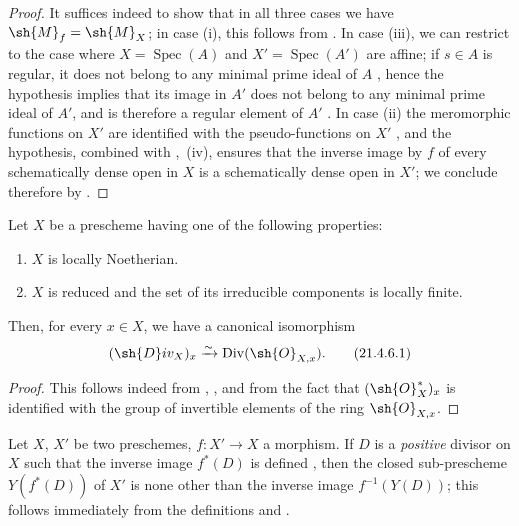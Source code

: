 \begin{proof}
It suffices indeed to show that in all three cases we have $\sh{M}_f=\sh{M}_X$;
in case (i), this follows from .
In case (iii), we can restrict to the case where $X=\operatorname{Spec}(A)$ and $X'=\operatorname{Spec}(A')$ are affine;
if $s\in A$ is regular, it does not belong to any minimal prime ideal of $A$ , hence the hypothesis implies that its image in $A'$ does not belong to any minimal prime ideal of $A'$, and is therefore a regular element of $A'$ .
In case (ii) the meromorphic functions on $X'$ are identified with the pseudo-functions on $X'$ , and the hypothesis, combined with ,~(iv), ensures that the inverse image
by $f$ of every schematically dense open in $X$ is a schematically dense open in $X'$;
we conclude therefore by .
\end{proof}

\begin{corollary}[21.4.6]
\label{IV.21.4.6}
Let $X$ be a prescheme having one of the following properties:
\begin{enumerate}[label=(\roman*)]
  \item $X$ is locally Noetherian.
  \item $X$ is reduced and the set of its irreducible components is locally finite.
\end{enumerate}
Then, for every $x\in X$, we have a canonical isomorphism
\[
\label{IV.21.4.6.1}
  (\sh{D}iv_X)_x\xrightarrow{\sim}\operatorname{Div}(\sh{O}_{X,x}).
  \tag{21.4.6.1}
\]
\end{corollary}

\begin{proof}
This follows indeed from , , and from the fact that $(\sh{O}_X^*)_x$ is identified with the group of invertible elements of the ring $\sh{O}_{X,x}$.
\end{proof}

\begin{env}[21.4.7]
\label{IV.21.4.7}
Let $X$, $X'$ be two preschemes, $f:X'\to X$ a morphism.
If $D$ is a \emph{positive} divisor on $X$ such that the inverse image $f^*(D)$ is defined , then the closed sub-prescheme $Y(f^*(D))$ of $X'$ is none other than the inverse image $f^{-1}(Y(D))$;
this follows immediately from the definitions  and .
\end{env}

